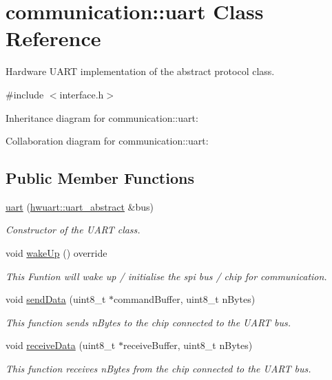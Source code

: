 \hypertarget{classcommunication_1_1uart}{}\section{communication\+:\+:uart Class Reference}
\label{classcommunication_1_1uart}


Hardware U\+A\+RT implementation of the abstract protocol class.  




{\ttfamily \#include $<$interface.\+h$>$}



Inheritance diagram for communication\+:\+:uart\+:


Collaboration diagram for communication\+:\+:uart\+:
\subsection*{Public Member Functions}
\begin{DoxyCompactItemize}
\item 
\hyperlink{classcommunication_1_1uart_a19c478e7264c848ff028811b7282b6a5}{uart} (\hyperlink{classhwuart_1_1uart__abstract}{hwuart\+::uart\+\_\+abstract} \&bus)
\begin{DoxyCompactList}\small\item\em Constructor of the U\+A\+RT class. \end{DoxyCompactList}\item 
void \hyperlink{classcommunication_1_1uart_aea97e95d698c8738fb891e5f0d65e288}{wake\+Up} () override
\begin{DoxyCompactList}\small\item\em This Funtion will wake up / initialise the spi bus / chip for communication. \end{DoxyCompactList}\item 
void \hyperlink{classcommunication_1_1uart_a915087d1f825171d705801de0981b151}{send\+Data} (uint8\+\_\+t $\ast$command\+Buffer, uint8\+\_\+t n\+Bytes)
\begin{DoxyCompactList}\small\item\em This function sends n\+Bytes to the chip connected to the U\+A\+RT bus. \end{DoxyCompactList}\item 
void \hyperlink{classcommunication_1_1uart_a37a51dcb95fb5178b5fa441acd437ae4}{receive\+Data} (uint8\+\_\+t $\ast$receive\+Buffer, uint8\+\_\+t n\+Bytes)
\begin{DoxyCompactList}\small\item\em This function receives n\+Bytes from the chip connected to the U\+A\+RT bus. \end{DoxyCompactList}\end{DoxyCompactItemize}


